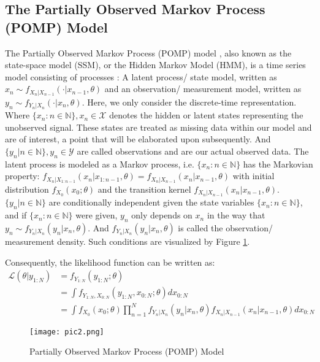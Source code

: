 \documentclass[10pt]{article}
\begin{document}
\subsection{The Partially Observed Markov Process (POMP) Model}
The Partially Observed Markov Process (POMP) model \citep{daihai}, also known as the state-space model (SSM), or the Hidden Markov Model (HMM), is a time series model consisting of processes \citep{Chopin, liujun, Doucet}: A latent process/ state model, written as $x_n \sim f_{X_n|X_{n-1}}(\cdot|x_{n-1},\theta)$ and an observation/ measurement model, written as $y_n \sim f_{Y_n|X_n}(\cdot|x_n,\theta)$. Here, we only consider the discrete-time representation. Where $\{x_n: n\in\mathds{N}\}, x_n \in \mathcal{X}$ denotes the hidden or latent states representing the unobserved signal. These states are treated as missing data within our model and are of interest, a point that will be elaborated upon subsequently. And $\{y_n|n\in \mathds{N}\}, y_n \in \mathcal{Y}$ are called observations and are our actual observed data. The latent process is modeled as a Markov process, i.e. $\{x_n: n\in\mathds{N}\}$ has the Markovian property: $f_{X_n|X_{1:n-1}}(x_n|x_{1:n-1}, \theta)=f_{X_n|X_{n-1}}(x_n|x_{n-1},\theta)$ with initial distribution $f_{X_0}(x_0;\theta)$ and the transition kernel $f_{X_n|X_{n-1}}(x_n|x_{n-1},\theta)$. $\{y_n|n\in \mathds{N}\}$ are conditionally independent given the state variables $\{x_n: n\in\mathds{N}\}$, and if $\{x_n: n\in\mathds{N}\}$ were given, $y_n$ only depends on $x_n$ in the way that $y_n \sim f_{Y_n|X_{n}}(y_n|x_n,\theta)$. And $f_{Y_n|X_{n}}(y_n|x_n,\theta)$ is called the observation/ measurement density. Such conditions are visualized by Figure \ref{fig1}.


Consequently, the likelihood function can be written as:
\vspace{-2mm}
\begin{align} 
\mathcal{L}(\theta|y_{1:N}) &= f_{Y_{1:N}}(y_{1:N}; \theta) \\
&= \int f_{Y_{1:N},X_{0:N}}(y_{1:N}, x_{0:N};\theta) dx_{0:N} \\
&= \int f_{X_0}(x_0;\theta) \prod_{n=1}^N
f_{Y_n|X_n}(y_n|x_n,\theta)
f_{X_n|X_{n-1}}(x_n|x_{n-1},\theta) dx_{0:N} 
\end{align}

\begin{figure}[h]
\centering
\texttt{[image: pic2.png]}
\caption{\label{fig:hiddenmarkovmodel}Partially Observed Markov Process (POMP) Model \citep{gettingstartpomp}}
\label{fig1}
\end{figure}
\end{document}
